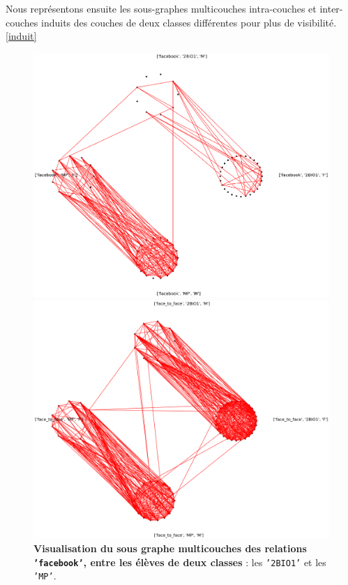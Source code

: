 \documentclass[11pt,a4paper]{article}
\theoremstyle{definition}
\theoremstyle{remark}
\theoremstyle{remark}
\begin{document}
	Nous représentons ensuite les sous-graphes multicouches intra-couches et inter-couches induits des couches de deux classes différentes pour plus de visibilité. \cref{induit}

\begin{figure}[H]
	\begin{minipage}[t]{0.48\textwidth}
		\captionsetup{margin=10pt}
		\includegraphics[width=\textwidth]{sousmulticlasse.png}
	\caption{\textbf{Visualisation du sous graphe multicouches des relations \texttt{'facebook'}, entre les élèves de deux classes} : les \texttt{'2BIO1'} et les \texttt{'MP'}.}
	\end{minipage}
	\begin{minipage}[t]{0.48\textwidth}
		\centering
		\includegraphics[width=\textwidth]{sousmulticlasseftf.png}

\end{minipage}
\end{figure}
\end{document}
